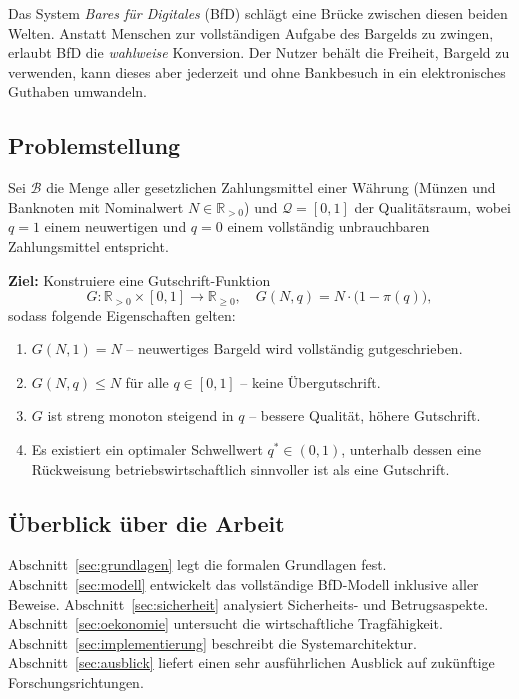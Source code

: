 ﻿\documentclass[a4paper,12pt]{article}
\theoremstyle{definition}
\begin{document}
Das System \emph{Bares für Digitales} (BfD) schlägt eine Brücke zwischen diesen
beiden Welten.  Anstatt Menschen zur vollständigen Aufgabe des Bargelds zu zwingen,
erlaubt BfD die \emph{wahlweise} Konversion.  Der Nutzer behält die Freiheit,
Bargeld zu verwenden, kann dieses aber jederzeit und ohne Bankbesuch in ein
elektronisches Guthaben umwandeln.

\subsection{Problemstellung}

Sei $\mathcal{B}$ die Menge aller gesetzlichen Zahlungsmittel einer Währung
(Münzen und Banknoten mit Nominalwert $N \in \mathbb{R}_{>0}$) und
$\mathcal{Q} = [0,1]$ der Qualitätsraum, wobei $q = 1$ einem neuwertigen
und $q = 0$ einem vollständig unbrauchbaren Zahlungsmittel entspricht.

\textbf{Ziel:} Konstruiere eine Gutschrift-Funktion
\[
G : \mathbb{R}_{>0} \times [0,1] \to \mathbb{R}_{\geq 0},
\quad
G(N, q) = N \cdot \bigl(1 - \pi(q)\bigr),
\]
sodass folgende Eigenschaften gelten:
\begin{enumerate}
  \item $G(N, 1) = N$ -- neuwertiges Bargeld wird vollständig gutgeschrieben.
  \item $G(N, q) \leq N$ für alle $q \in [0,1]$ -- keine Übergutschrift.
  \item $G$ ist streng monoton steigend in $q$ -- bessere Qualität, höhere Gutschrift.
  \item Es existiert ein optimaler Schwellwert $q^* \in (0,1)$, unterhalb dessen
        eine Rückweisung betriebswirtschaftlich sinnvoller ist als eine Gutschrift.
\end{enumerate}

\subsection{Überblick über die Arbeit}

Abschnitt~\ref{sec:grundlagen} legt die formalen Grundlagen fest.
Abschnitt~\ref{sec:modell} entwickelt das vollständige BfD-Modell inklusive
aller Beweise.  Abschnitt~\ref{sec:sicherheit} analysiert Sicherheits- und
Betrugsaspekte.  Abschnitt~\ref{sec:oekonomie} untersucht die wirtschaftliche
Tragfähigkeit.  Abschnitt~\ref{sec:implementierung} beschreibt die
Systemarchitektur.  Abschnitt~\ref{sec:ausblick} liefert einen sehr ausführlichen
Ausblick auf zukünftige Forschungsrichtungen.
\end{document}
